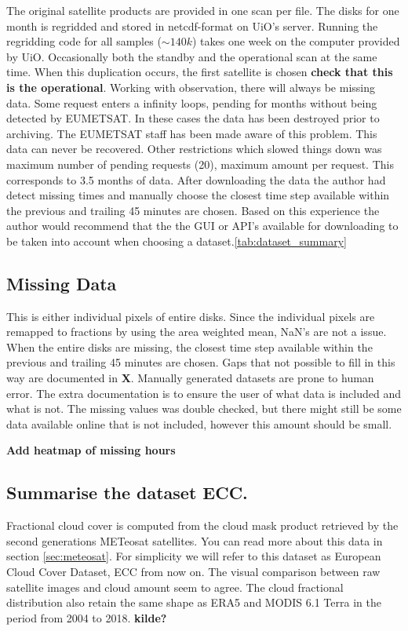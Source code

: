 The original satellite products are provided in one scan per file. The disks for one month is regridded and stored in \acrshort{netcdf}-format on UiO's server. Running the regridding code for all samples ($\sim 140k$) takes one week on the computer provided by UiO. Occasionally both the standby and the operational scan at the same time. When this duplication occurs, the first satellite is chosen \textbf{check that this is the operational}. Working with observation, there will always be missing data. Some request enters a infinity loops, pending for months without being detected by EUMETSAT. In these cases the data has been destroyed prior to archiving. The EUMETSAT staff has been made aware of this problem. This data can never be recovered. Other restrictions which slowed things down was maximum number of pending requests (20), maximum amount per request. This corresponds to 3.5 months of data. After downloading the data the author had detect missing times and manually choose the closest time step available within the previous and trailing 45 minutes are chosen. Based on this experience the author would recommend that the the GUI or API's available for downloading to be taken into account when choosing a dataset.\ref{tab:dataset_summary}

\subsection{Missing Data} \label{sec:missing_values}
This is either individual pixels of entire disks. Since the individual pixels are remapped to fractions by using the area weighted mean, NaN's are not a issue. When the entire disks are missing, the closest time step available within the previous and trailing 45 minutes are chosen. Gaps that not possible to fill in this way are documented in \textbf{X}. Manually generated datasets are prone to human error. The extra documentation is to ensure the user of what data is included and what is not. The missing values was double checked, but there might still be some data available online that is not included, however this amount should be small.

\textbf{Add heatmap of missing hours}

\subsection{Summarise the dataset ECC.}
Fractional cloud cover is computed from the cloud mask product retrieved by the second generations METeosat satellites. You can read more about this data in section \ref{sec:meteosat}. For simplicity we will refer to this dataset as European Cloud Cover Dataset, ECC from now on. The visual comparison between raw satellite images and cloud amount seem to agree. The cloud fractional distribution also retain the same shape as ERA5 and MODIS 6.1 Terra in the period from 2004 to 2018. \textbf{kilde?}

